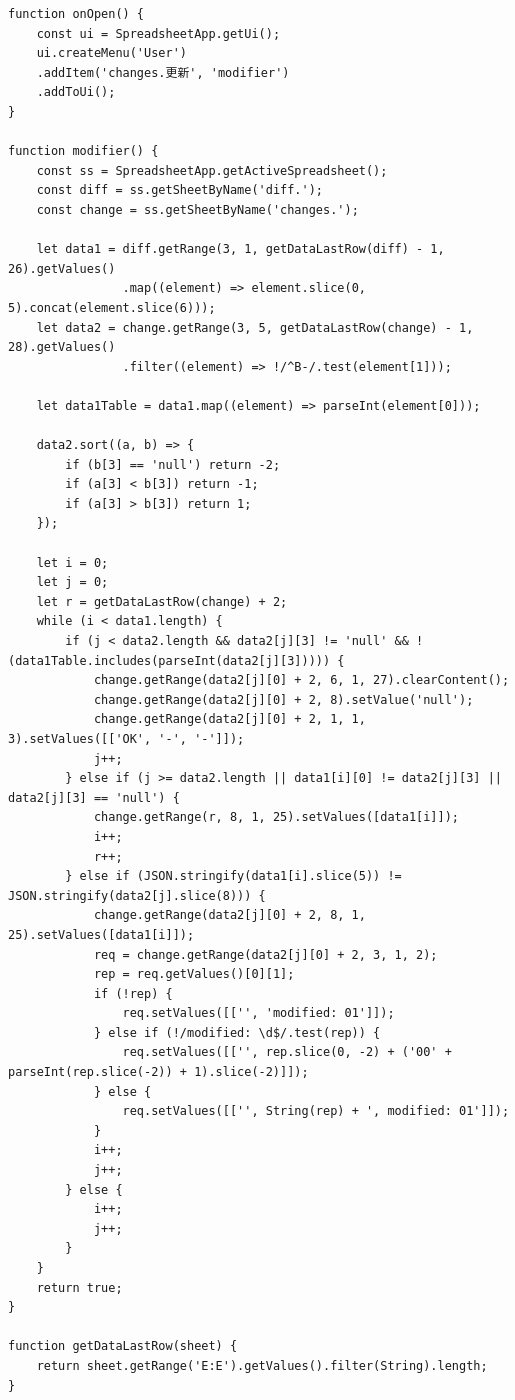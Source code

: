 \documentclass[dvipdfmx,jb5]{jreport}
\begin{document}
\begin{lstlisting}
function onOpen() {
    const ui = SpreadsheetApp.getUi();
    ui.createMenu('User')
    .addItem('changes.更新', 'modifier')
    .addToUi();
}

function modifier() {
    const ss = SpreadsheetApp.getActiveSpreadsheet();
    const diff = ss.getSheetByName('diff.');
    const change = ss.getSheetByName('changes.');

    let data1 = diff.getRange(3, 1, getDataLastRow(diff) - 1, 26).getValues()
                .map((element) => element.slice(0, 5).concat(element.slice(6)));
    let data2 = change.getRange(3, 5, getDataLastRow(change) - 1, 28).getValues()
                .filter((element) => !/^B-/.test(element[1]));

    let data1Table = data1.map((element) => parseInt(element[0]));

    data2.sort((a, b) => {
        if (b[3] == 'null') return -2;
        if (a[3] < b[3]) return -1;
        if (a[3] > b[3]) return 1;
    });

    let i = 0;
    let j = 0;
    let r = getDataLastRow(change) + 2;
    while (i < data1.length) {
        if (j < data2.length && data2[j][3] != 'null' && !(data1Table.includes(parseInt(data2[j][3])))) {
            change.getRange(data2[j][0] + 2, 6, 1, 27).clearContent();
            change.getRange(data2[j][0] + 2, 8).setValue('null');
            change.getRange(data2[j][0] + 2, 1, 1, 3).setValues([['OK', '-', '-']]);
            j++;
        } else if (j >= data2.length || data1[i][0] != data2[j][3] || data2[j][3] == 'null') {
            change.getRange(r, 8, 1, 25).setValues([data1[i]]);
            i++;
            r++;
        } else if (JSON.stringify(data1[i].slice(5)) != JSON.stringify(data2[j].slice(8))) {
            change.getRange(data2[j][0] + 2, 8, 1, 25).setValues([data1[i]]);
            req = change.getRange(data2[j][0] + 2, 3, 1, 2);
            rep = req.getValues()[0][1];
            if (!rep) {
                req.setValues([['', 'modified: 01']]);
            } else if (!/modified: \d$/.test(rep)) {
                req.setValues([['', rep.slice(0, -2) + ('00' + parseInt(rep.slice(-2)) + 1).slice(-2)]]);
            } else {
                req.setValues([['', String(rep) + ', modified: 01']]);
            }
            i++;
            j++;
        } else {
            i++;
            j++;
        }
    }
    return true;
}

function getDataLastRow(sheet) {
    return sheet.getRange('E:E').getValues().filter(String).length;
}
\end{lstlisting}
\end{document}
